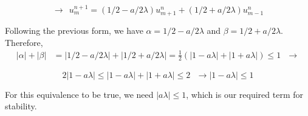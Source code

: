 \documentclass[12pt]{article}
\begin{document}
$$ \longrightarrow~~u_m^{n+1} = (1/2-a/2\lambda)u_{m+1}^n + (1/2+a/2\lambda)u_{m-1}^n $$

Following the previous form, we have $\alpha = 1/2-a/2\lambda$ and $\beta =1/2+a/2\lambda$. Therefore,
$$ \begin{aligned}
	|\alpha| + |\beta| & = |1/2-a/2\lambda| + |1/2+a/2\lambda|=\frac{1}{2}(|1-a\lambda| + |1+a\lambda|)\leq 1 ~~~\longrightarrow
\end{aligned} $$

$$ 2|1-a\lambda| \leq |1-a\lambda| + |1+a\lambda| \leq 2 ~~~\longrightarrow |1-a\lambda|\leq 1$$

For this equivalence to be true, we need $|a\lambda|\leq1$, which is our required term for stability.
\end{document}
